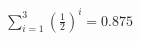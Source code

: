 \documentclass[preview]{standalone}
\begin{document}
\begin{align*}
\sum_{i=1}^{3} \left(\frac{1}{2}\right)^i = {0.875}
\end{align*}
\end{document}
